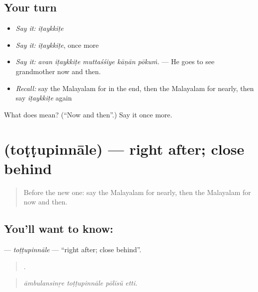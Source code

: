\subsection*{Your turn}
\begin{itemize}
\raggedright
  \item \emph{Say it:} \emph{iṭaykkiṭe}
  \item \emph{Say it:} \emph{iṭaykkiṭe}, once more
  \item \emph{Say it:} \emph{avan iṭaykkiṭe muttaśśiye kāṇān pōkuṁ.} — He goes to see grandmother now and then.
  \item \emph{Recall:} say the Malayalam for in the end, then the Malayalam for nearly, then say \emph{iṭaykkiṭe} again
\end{itemize}

\begin{tcolorbox}[breakable,colback=teal!4,colframe=teal!35!black,title={Before you move on}]
What does  mean? (\textquotedblleft{}Now and then\textquotedblright{}.) Say it once more.
\end{tcolorbox}
\section[\texorpdfstring{\ml{തൊട്ടുപിന്നാലെ} (toṭṭupinnāle)}{തൊട്ടുപിന്നാലെ (toṭṭupinnāle)}]{ (toṭṭupinnāle) — right after; close behind}

\label{lesson:ML-C359-tottupinnale}



\begin{quote}
Before the new one: say the Malayalam for nearly, then the Malayalam for now and then.
\end{quote}

\subsection*{You'll want to know: }
\textbf{} — \emph{toṭṭupinnāle} — \textquotedblleft{}right after; close behind\textquotedblright{}.

\begin{quote}
   .
\end{quote}

\begin{quote}
\emph{āmbulansinṟe toṭṭupinnāle pōlīsŭ etti.}
\end{quote}

